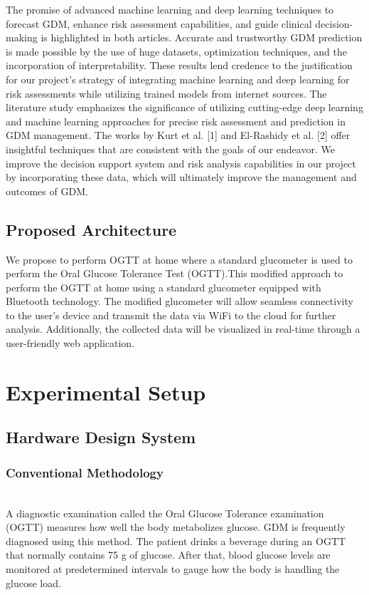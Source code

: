 \documentclass[conference,compsoc]{IEEEtran}
\begin{document}
The promise of advanced machine learning and deep learning techniques to forecast GDM, enhance risk assessment capabilities, and guide clinical decision-making is highlighted in both articles. Accurate and trustworthy GDM prediction is made possible by the use of huge datasets, optimization techniques, and the incorporation of interpretability. These results lend credence to the justification for our project's strategy of integrating machine learning and deep learning for risk assessments while utilizing trained models from internet sources.
The literature study emphasizes the significance of utilizing cutting-edge deep learning and machine learning approaches for precise risk assessment and prediction in GDM management. The works by Kurt et al. [1] and El-Rashidy et al. [2] offer insightful techniques that are consistent with the goals of our endeavor. We improve the decision support system and risk analysis capabilities in our project by incorporating these data, which will ultimately improve the management and outcomes of GDM.

\subsection{Proposed Architecture}

We propose to perform OGTT at home where a standard glucometer is used  to perform the Oral Glucose Tolerance Test (OGTT).This modified approach to perform the OGTT at home using a standard glucometer equipped with Bluetooth technology. The modified glucometer will allow seamless connectivity to the user's device and transmit the data via WiFi to the cloud for further analysis. Additionally, the collected data will be visualized in real-time through a user-friendly web application. 


\section{Experimental Setup}
\subsection{Hardware Design System}
\subsubsection{Conventional Methodology}\\

A diagnostic examination called the Oral Glucose Tolerance examination (OGTT) measures how well the body metabolizes glucose. GDM is frequently diagnosed using this method. The patient drinks a beverage during an OGTT that normally contains 75 g of glucose. After that, blood glucose levels are monitored at predetermined intervals to gauge how the body is handling the glucose load.
\end{document}
